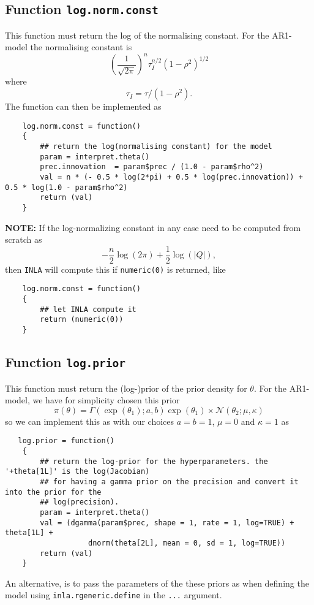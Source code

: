 \documentclass[a4paper,11pt]{article}
\begin{document}
\subsection*{Function \texttt{log.norm.const}}

This function must return the log of the normalising constant. For the
AR1-model the normalising constant is
\begin{displaymath}
    \left(\frac{1}{\sqrt{2\pi}}\right)^{n} \tau_{I}^{n/2} (1-\rho^{2})^{1/2}
\end{displaymath}
where
\begin{displaymath}
    \tau_{I} = \tau/(1-\rho^{2}).
\end{displaymath}
The function can then be implemented as
{\small
\begin{verbatim}
    log.norm.const = function()
    {
        ## return the log(normalising constant) for the model
        param = interpret.theta()
        prec.innovation  = param$prec / (1.0 - param$rho^2)
        val = n * (- 0.5 * log(2*pi) + 0.5 * log(prec.innovation)) + 0.5 * log(1.0 - param$rho^2)
        return (val)
    }
\end{verbatim}
}
\noindent
\textbf{NOTE:} If the log-normalizing constant in any case need to be
computed from scratch as $$-\frac{n}{2}\log(2\pi) +
\frac{1}{2} \log(|{Q}|),$$ then \texttt{INLA} will compute this if
\texttt{numeric(0)} is returned, like {\small
\begin{verbatim}
    log.norm.const = function()
    {
        ## let INLA compute it
        return (numeric(0))
    }
\end{verbatim}
}


\subsection*{Function \texttt{log.prior}}

This function must return the (log-)prior of the prior density for
$\theta$. For the AR1-model, we have for simplicity chosen this prior
\begin{displaymath}
    \pi(\theta) = \Gamma(\exp(\theta_1); a,b) \exp(\theta_1) \times
    {\mathcal N}(\theta_{2}; \mu, \kappa)
\end{displaymath}
so we can implement this as with our choices $a=b=1$, $\mu=0$ and
$\kappa=1$ as
{\small
\begin{verbatim}
   log.prior = function()
    {
        ## return the log-prior for the hyperparameters. the '+theta[1L]' is the log(Jacobian)
        ## for having a gamma prior on the precision and convert it into the prior for the
        ## log(precision).
        param = interpret.theta()
        val = (dgamma(param$prec, shape = 1, rate = 1, log=TRUE) + theta[1L] + 
                   dnorm(theta[2L], mean = 0, sd = 1, log=TRUE))
        return (val)
    }
\end{verbatim}
}
An alternative, is to pass the parameters of the these priors as when
defining the model using \texttt{inla.rgeneric.define} in the
\texttt{...} argument.
\end{document}
